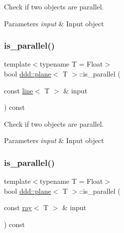 Check if two objects are parallel. 


\begin{DoxyParams}{Parameters}
{\em input} & Input object \\
\hline
\end{DoxyParams}
\mbox{\label{classddd_1_1plane_a07ebd469641fe441db7bf3ba67ea5e01}} 
\subsubsection{\texorpdfstring{is\+\_\+parallel()}{is\_parallel()}\hspace{0.1cm}{\footnotesize\ttfamily [2/5]}}
{\footnotesize\ttfamily template$<$typename T = Float$>$ \\
bool \hyperlink{classddd_1_1plane}{ddd\+::plane}$<$ T $>$\+::is\+\_\+parallel (\begin{DoxyParamCaption}\item[{const \hyperlink{classddd_1_1line}{line}$<$ T $>$ \&}]{input }\end{DoxyParamCaption}) const\hspace{0.3cm}{\ttfamily [inline]}}



Check if two objects are parallel. 


\begin{DoxyParams}{Parameters}
{\em input} & Input object \\
\hline
\end{DoxyParams}
\mbox{\label{classddd_1_1plane_a29f6dd828983c11764422814a86559ed}} 
\subsubsection{\texorpdfstring{is\+\_\+parallel()}{is\_parallel()}\hspace{0.1cm}{\footnotesize\ttfamily [3/5]}}
{\footnotesize\ttfamily template$<$typename T = Float$>$ \\
bool \hyperlink{classddd_1_1plane}{ddd\+::plane}$<$ T $>$\+::is\+\_\+parallel (\begin{DoxyParamCaption}\item[{const \hyperlink{classddd_1_1ray}{ray}$<$ T $>$ \&}]{input }\end{DoxyParamCaption}) const\hspace{0.3cm}{\ttfamily [inline]}}



